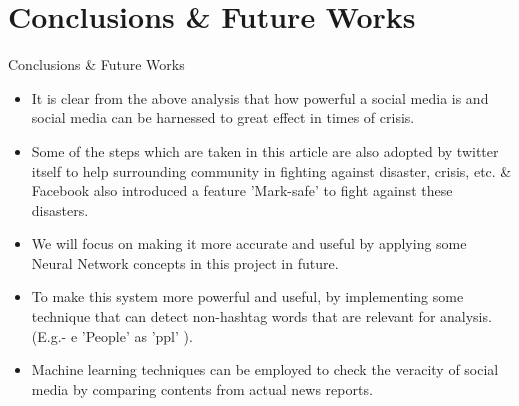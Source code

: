 \documentclass[10pt]{beamer}
\begin{document}
\section{Conclusions \& Future Works}
\begin{frame}[fragile]{ Conclusions \& Future Works}

\begin{itemize}


\item It is clear from the above analysis that how powerful a
social media is and social media can be harnessed
to great effect in times of crisis. 
\item Some of the steps which
are taken in this article are also adopted by twitter itself to
help surrounding community in fighting against disaster, crisis,
etc. \& Facebook also introduced a feature 'Mark-safe' to fight against these disasters. 
\item  We
will focus on making it more accurate and useful by applying
some Neural Network concepts in this project in future. 
\item To
make this system more powerful and useful, by implementing
some technique that can detect non-hashtag words that are
relevant for analysis.(E.g.- e ’People’
as ’ppl’ ).
\item Machine learning techniques
can be employed to check the veracity of social media by
comparing contents from actual news reports.


\end{itemize}



\end{frame}
\end{document}
